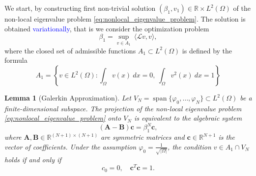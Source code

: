 \documentclass[12pt, a4paper]{article}
\newcommand{\revision}[1]{\textcolor{blue}{#1}}
\theoremstyle{break}
\theoremstyle{break}
\theoremstyle{break}
\theoremstyle{break}
\theoremstyle{break}
\newtheorem{lem}{Lemma}[section]
\theoremstyle{break}
\theoremstyle{break}
\theoremstyle{break}
\theoremstyle{break}
\begin{document}
We start, by constructing first non-trivial solution $(\beta_1, v_1) \in \mathbb{R} \times L^2(\Omega)$ of the non-local eigenvalue problem \eqref{eq:nonlocal_eigenvalue_problem}. The solution is obtained \revision{variationally}, that is we consider the optimization problem
\begin{equation}
    \label{eq:eigenvalue_problem_1}
    \beta_1 = \sup_{v \in A_1} \: \langle \mathcal L v, v \rangle,
\end{equation}
where the closed set of admissible functions $A_1 \subset L^2(\Omega)$ is defined by the formula
\begin{equation}
    \label{eq:A_set_Def}
    A_1 = \left\{ v \in L^2(\Omega) : \int_\Omega v(x) \:dx = 0, \: \int_\Omega v^2(x) \:dx = 1 \right\}
\end{equation}

\begin{lem}[Galerkin Approximation]
\label{lem:galerkin_approximation}
Let $V_N = \operatorname{span}\{\varphi_0, \dots, \varphi_N\} \subset L^2(\Omega)$ be a finite-dimensional subspace. The projection of the non-local eigenvalue problem \eqref{eq:nonlocal_eigenvalue_problem} onto $V_N$ is equivalent to the algebraic system 
\begin{equation}
    \label{eq:matrix_system_lemma}
    (\mathbf{A} - \mathbf{B})\mathbf{c} = \beta_1^N \mathbf{c},
\end{equation}
    where $\mathbf{A}, \mathbf{B} \in \mathbb{R}^{(N+1) \times (N+1)}$ are symmetric matrices and $\mathbf{c} \in \mathbb{R}^{N+1}$ is the vector of coefficients. Under the assumption $\varphi_0 = \frac{1}{\sqrt{|\Omega|}}$, the condition $v \in A_1 \cap V_N$ holds if and only if
    \begin{equation}
        \label{eq:system_constraint_lemma}
        c_0 = 0, \quad \mathbf{c}^T\mathbf{c} = 1.
    \end{equation}
\end{lem}
\end{document}
